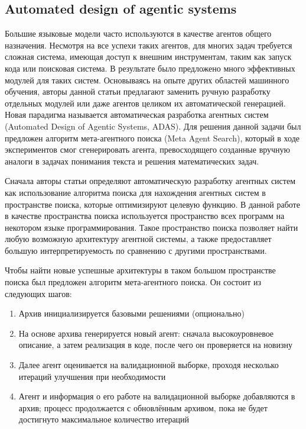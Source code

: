 \documentclass[a4paper,14pt]{extarticle}
\begin{document}
\subsection{Automated design of agentic systems}

    Большие языковые модели часто используются в качестве агентов общего назначения.
    Несмотря на все успехи таких агентов, для многих задач требуется сложная система, имеющая доступ к внешним инструментам, таким как запуск кода или поисковая система.
    В результате было предложено много эффективных модулей для таких систем.
    Основываясь на опыте других областей машинного обучения, авторы данной статьи предлагают заменить ручную разработку отдельных модулей или даже агентов целиком их автоматической генерацией.
    Новая парадигма называется автоматическая разработка агентных систем (Automated Design of Agentic Systems, ADAS).
    Для решения данной задачи был предложен алгоритм мета-агентного поиска (Meta Agent Search), который в ходе экспериментов смог сгенерировать агента, превосходящего созданные вручную аналоги в задачах понимания текста и решения математических задач.

    Сначала авторы статьи определяют автоматическую разработку агентных систем как использование алгоритма поиска для нахождения агентных систем в пространстве поиска, которые оптимизируют целевую функцию.
    В данной работе в качестве пространства поиска используется пространство всех программ на некотором языке программирования.
    Такое пространство поиска позволяет найти любую возможную архитектуру агентной системы, а также предоставляет большую интерпретируемость по сравнению с другими пространствами.

    Чтобы найти новые успешные архитектуры в таком большом пространстве поиска был предложен алгоритм мета-агентного поиска.
    Он состоит из следующих шагов:
    \begin{enumerate}
        \item Архив инициализируется базовыми решениями (опционально)
        \item На основе архива генерируется новый агент: сначала высокоуровневое описание, а затем реализация в коде, после чего он проверяется на новизну
        \item Далее агент оценивается на валидационной выборке, проходя несколько итераций улучшения при необходимости
        \item Агент и информация о его работе на валидационной выборке добавляются в архив; процесс продолжается с обновлённым архивом, пока не будет достигнуто максимальное количество итераций
    \end{enumerate}
\end{document}
